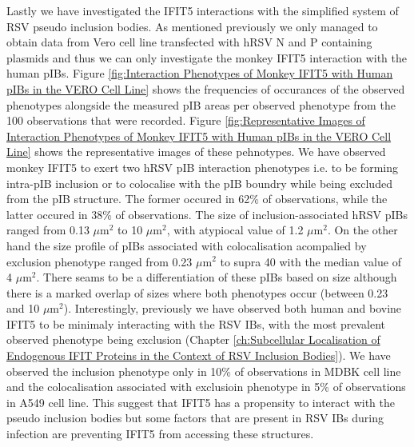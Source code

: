 Lastly we have investigated the IFIT5 interactions with the simplified system of RSV pseudo inclusion bodies. As mentioned previously we only managed to obtain data from Vero cell line transfected with hRSV N and P containing plasmids and thus we can only investigate the monkey IFIT5 interaction with the human pIBs. Figure \ref{fig:Interaction Phenotypes of Monkey IFIT5 with Human pIBs in the VERO Cell Line} shows the frequencies of occurances of the observed phenotypes alongside the measured pIB areas per observed phenotype from the 100 observations that were recorded. Figure \ref{fig:Representative Images of Interaction Phenotypes of Monkey IFIT5 with Human pIBs in the VERO Cell Line} shows the representative images of these pehnotypes. We have observed monkey IFIT5 to exert two hRSV pIB interaction phenotypes i.e. to be forming intra-pIB inclusion or to colocalise with the pIB boundry while being excluded from the pIB structure. The former occured in 62\% of observations, while the latter occured in 38\% of observations. The size of inclusion-associated hRSV pIBs ranged from 0.13 \(\mu \mbox{m}^2\) to 10 \(\mu \mbox{m}^2\), with atypiocal value of 1.2 \(\mu \mbox{m}^2\). On the other hand the size profile of pIBs associated with colocalisation acompalied by exclusion phenotype ranged from 0.23 \(\mu \mbox{m}^2\) to supra 40 with the median value of 4 \(\mu \mbox{m}^2\). There seams to be a differentiation of these pIBs based on size although there is a marked overlap of sizes where both phenotypes occur (between 0.23 and 10 \(\mu \mbox{m}^2\)). Interestingly, previously we have observed both human and bovine IFIT5 to be minimaly interacting with the RSV IBs, with the most prevalent observed phenotype being exclusion (Chapter \ref{ch:Subcellular Localisation of Endogenous IFIT Proteins in the Context of RSV Inclusion Bodies}). We have observed the inclusion phenotype only in 10\% of observations in MDBK cell line and the colocalisation associated with exclusioin phenotype in 5\% of observations in A549 cell line. This suggest that IFIT5 has a propensity to interact with the pseudo inclusion bodies but some factors that are present in RSV IBs during infection are preventing IFIT5 from accessing these structures.

